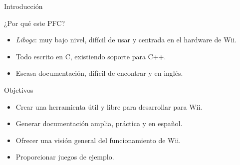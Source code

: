 \begin{frame}{Introducción}
	\begin{block}{¿Por qué este PFC?}
	\begin{itemize}
		\item \textit{Libogc}: muy bajo nivel, difícil de usar y centrada en el hardware de Wii.
		\item Todo escrito en C, existiendo soporte para C++.
		\item Escasa documentación, difícil de encontrar y en inglés.
	\end{itemize}
	\end{block}
	\pause
	\begin{block}{Objetivos}
	\begin{itemize}
		\item Crear una herramienta útil y libre para desarrollar para Wii.
		\item Generar documentación amplia, práctica y en español.
		\item Ofrecer una visión general del funcionamiento de Wii.
		\item Proporcionar juegos de ejemplo.
	\end{itemize}
	\end{block}
\end{frame}

